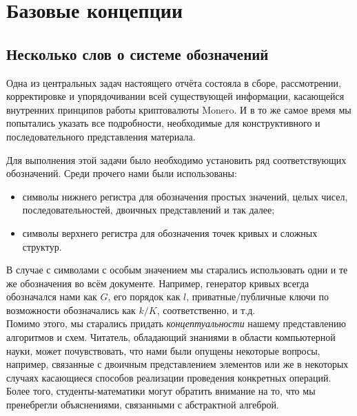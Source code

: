 \chapter{Базовые концепции}
\label{chapter:basicConcepts}



\section{Несколько слов о системе обозначений}

Одна из центральных задач настоящего отчёта состояла в сборе, рассмотрении, корректировке и упорядочивании всей существующей информации, касающейся внутренних принципов рабо\-ты криптовалюты Monero. И в то же самое время мы попытались указать все подробности, необходимые для конструктивного и последовательного представления материала.

Для выполнения этой задачи было необходимо установить ряд соответствующих обозначений. Среди прочего нами были использованы:

\begin{itemize}
\item символы нижнего регистра для обозначения простых значений, целых чисел, последова\-тельностей, двоичных представлений и так далее;
\item символы верхнего регистра для обозначения точек кривых и сложных структур.
\end{itemize}

В случае с символами с особым значением мы старались использовать одни и те же обозначе\-ния во всём документе. Например, генератор кривых всегда обозначался нами как \(G\), его порядок как \(l\), приватные/публичные ключи по возможности обозначались как \(k/K\), соответ\-ственно, и т.д.
\\

Помимо этого, мы старались придать {\em концептуальности} нашему представлению алгоритмов и схем. Читатель, обладающий знаниями в области компьютерной науки, может почувство\-вать, что нами были опущены некоторые вопросы, например, связанные с двоичным представ\-лением элементов или же в некоторых случаях касающиеся способов реализации проведения конкретных операций. Более того, студенты-математики могут обратить внимание на то, что мы пренебрегли объяснениями, связанными с абстрактной алгеброй.

